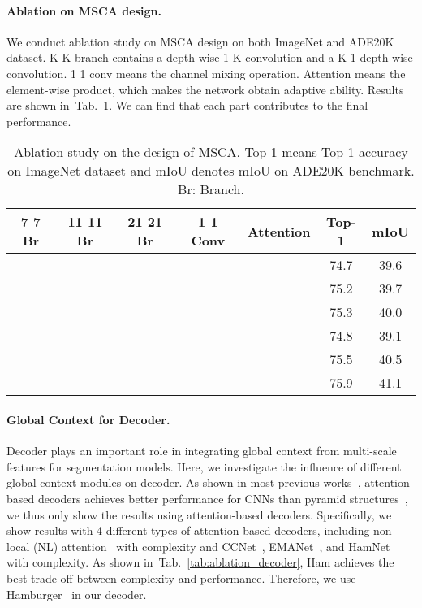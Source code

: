 \documentclass{article}
\newcommand{\cmark}{\ding{51}}\newcommand{\xmark}{\text{\ding{55}}}
\newcommand{\tabref}[1]{Tab.~\ref{#1}}
\begin{document}
\paragraph{Ablation on MSCA design.}
We conduct ablation study on MSCA design on both ImageNet and ADE20K dataset.
K  K branch contains a depth-wise 1  K convolution and a K  1 depth-wise convolution.
1  1 conv means the channel mixing operation.
Attention means the element-wise product,
which makes the network obtain adaptive ability.
Results are shown in~\tabref{Tab.ablation_msca}.  
We can find that each part contributes to the final performance.

\begin{table}[htp!]
  \centering
  \setlength{\tabcolsep}{2.6mm}
  \caption{Ablation study on the design of MSCA. Top-1 means Top-1 accuracy on ImageNet dataset and mIoU denotes mIoU on ADE20K benchmark. Br: Branch.}
  \begin{tabular}{c|c|c|c|c|c|c}
    \toprule
    \textbf{7  7 Br} & \textbf{11  11 Br} & \textbf{21  21 Br} & \textbf{1  1 Conv}  
      & \textbf{Attention} &  \textbf{Top-1} &  \textbf{mIoU} \\ \midrule
       \cmark   & \xmark & \xmark & \cmark & \cmark & 74.7 & 39.6 \\ 
       \xmark   & \cmark & \xmark & \cmark & \cmark & 75.2 & 39.7 \\ 
       \xmark   & \xmark & \cmark & \cmark & \cmark & 75.3 & 40.0 \\ 
       \cmark   & \cmark & \cmark & \xmark & \cmark & 74.8 & 39.1 \\ 
       \cmark   & \cmark & \cmark & \cmark & \xmark & 75.5 & 40.5 \\ 
       \cmark   & \cmark & \cmark & \cmark & \cmark & 75.9 & 41.1 \\ 
    \bottomrule
  \end{tabular}
  \label{Tab.ablation_msca}
\end{table}



\paragraph{Global Context for Decoder.} 
Decoder plays an important role in integrating global context from multi-scale features for segmentation models.
Here, we investigate the influence of different global context modules on decoder.
As shown in most previous works~\cite{wang2018non,fu2019dual}, attention-based
decoders achieves better performance for CNNs than pyramid structures~\cite{zhao2017pyramid,chen2017deeplab}, we thus only show the results using attention-based decoders.
Specifically, we show results with 4 different types of attention-based decoders,
including non-local (NL) attention~\cite{wang2018non} with  complexity
and CCNet~\cite{huang2019ccnet}, EMANet~\cite{li2019expectation}, and HamNet~\cite{geng2021attention} with  complexity.
As shown in~\tabref{tab:ablation_decoder}, Ham achieves the best trade-off between complexity and performance.
Therefore, we use Hamburger~\cite{geng2021attention} in our decoder.
\end{document}
